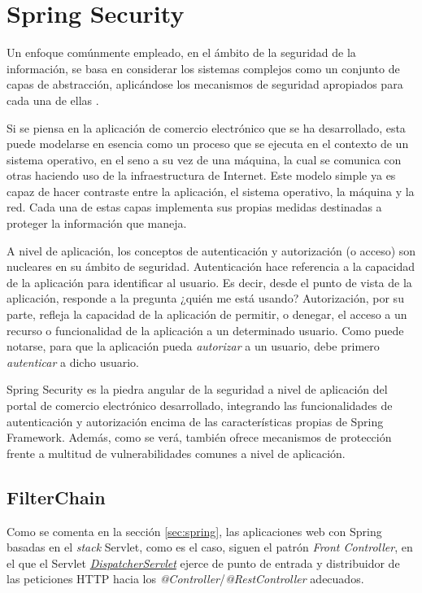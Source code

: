 \documentclass[a4paper,12pt,twoside,openright]{report}
\begin{document}
	\section{Spring Security} \label{sec:springsec}
	Un enfoque comúnmente empleado, en el ámbito de la seguridad de la información, se basa en considerar los sistemas complejos como un conjunto de capas de abstracción, aplicándose los mecanismos de seguridad apropiados para cada una de ellas \cite{CarloScarioni2019}.
	
	Si se piensa en la aplicación de comercio electrónico que se ha desarrollado, esta puede modelarse en esencia como un proceso que se ejecuta en el contexto de un sistema operativo, en el seno a su vez de una máquina, la cual se comunica con otras haciendo uso de la infraestructura de Internet. Este modelo simple ya es capaz de hacer contraste entre la aplicación, el sistema operativo, la máquina y la red. Cada una de estas capas implementa sus propias medidas destinadas a proteger la información que maneja.
	
	A nivel de aplicación, los conceptos de autenticación y autorización (o acceso) son nucleares en su ámbito de seguridad. Autenticación hace referencia a la capacidad de la aplicación para identificar al usuario. Es decir, desde el punto de vista de la aplicación, responde a la pregunta ¿quién me está usando? Autorización, por su parte, refleja la capacidad de la aplicación de permitir, o denegar, el acceso a un recurso o funcionalidad de la aplicación a un determinado usuario. Como puede notarse, para que la aplicación pueda \emph{autorizar} a un usuario, debe primero \emph{autenticar} a dicho usuario.
	
	Spring Security es la piedra angular de la seguridad a nivel de aplicación del portal de comercio electrónico desarrollado, integrando las funcionalidades de autenticación y autorización encima de las características propias de Spring Framework. Además, como se verá, también ofrece mecanismos de protección frente a multitud de vulnerabilidades comunes a nivel de aplicación.
	
	\subsection{FilterChain}
	Como se comenta en la sección \ref{sec:spring}, las aplicaciones web con Spring basadas en el \emph{stack} Servlet, como es el caso, siguen el patrón \emph{Front Controller}, en el que el Servlet \href{https://docs.spring.io/spring/docs/current/spring-framework-reference/web.html#mvc-servlet}{\emph{DispatcherServlet}} ejerce de punto de entrada y distribuidor de las peticiones HTTP hacia los \emph{@Controller}/\emph{@RestController} adecuados.
	
\end{document}
